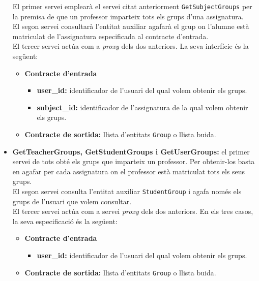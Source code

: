 \begin{itemize}
			El primer servei emplearà el servei citat anteriorment \texttt{GetSubjectGroups} per la premisa de que un professor imparteix tots els grups d'una assignatura.\\
			
			El segon servei consultarà l'entitat auxiliar agafarà el grup on l'alumne està matriculat de l'assignatura especificada al contracte d'entrada.\\
			
			El tercer servei actúa com a \emph{proxy} dels dos anteriors. La seva interfície és la següent:
				\begin{itemize}
					\item \textbf{Contracte d'entrada}
						\begin{itemize}
							\item \textbf{user\_id:} identificador de l'usuari del qual volem obtenir els grups.
							\item \textbf{subject\_id:} identificador de l'assignatura de la qual volem obtenir els grups.
						\end{itemize}
					\item \textbf{Contracte de sortida:} llista d'entitats \texttt{Group} o llista buida.
				\end{itemize}
			
			\item \textbf{GetTeacherGroups, GetStudentGroups i GetUserGroups:} el primer servei de tots obté els grups que imparteix un professor. Per obtenir-los basta en agafar per cada assignatura on el professor està matriculat tots els seus grups.\\
			
			El segon servei consulta l'entitat auxiliar \texttt{StudentGroup} i agafa només els grups de l'usuari que volem consultar.\\
			
			El tercer servei actúa com a servei \emph{proxy} dels dos anteriors. En els tres casos, la seva especificació és la següent:
		
			\begin{itemize}
					\item \textbf{Contracte d'entrada}
						\begin{itemize}
							\item \textbf{user\_id:} identificador de l'usuari del qual volem obtenir els grups.
						\end{itemize}
					\item \textbf{Contracte de sortida:} llista d'entitats \texttt{Group} o llista buida.
				\end{itemize}
				
		\end{itemize}


